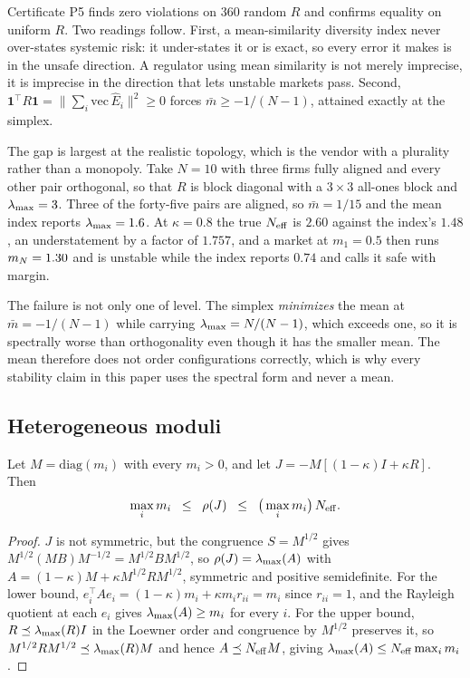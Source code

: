 Certificate P5 finds zero violations on 360 random $R$ and confirms equality on uniform $R$. Two readings follow. First, a mean-similarity diversity index never over-states systemic risk: it under-states it or is exact, so every error it makes is in the unsafe direction. A regulator using mean similarity is not merely imprecise, it is imprecise in the direction that lets unstable markets pass. Second, $\mathbf{1}^{\top}R\mathbf{1} = \|\sum_i \mathrm{vec}\,\hat{E}_i\|^2 \geq 0$ forces $\bar{m} \geq -1/(N-1)$, attained exactly at the simplex.

The gap is largest at the realistic topology, which is the vendor with a plurality rather than a monopoly. Take $N=10$ with three firms fully aligned and every other pair orthogonal, so that $R$ is block diagonal with a $3\times 3$ all-ones block and $\lambda_{\max} = 3$. Three of the forty-five pairs are aligned, so $\bar{m} = 1/15$ and the mean index reports $\lambda_{\max} = 1.6$. At $\kappa = 0.8$ the true $N_{\mathrm{eff}}$ is $2.60$ against the index's $1.48$, an understatement by a factor of $1.757$, and a market at $m_1 = 0.5$ then runs $m_N = 1.30$ and is unstable while the index reports $0.74$ and calls it safe with margin.

The failure is not only one of level. The simplex \emph{minimizes} the mean at $\bar{m} = -1/(N-1)$ while carrying $\lambda_{\max} = N/(N-1)$, which exceeds one, so it is spectrally worse than orthogonality even though it has the smaller mean. The mean therefore does not order configurations correctly, which is why every stability claim in this paper uses the spectral form and never a mean.

\subsection{Heterogeneous moduli}

\begin{aproposition}
\label{prop:hetmod}
Let $M=\mathrm{diag}(m_i)$ with every $m_i>0$, and let $J = -M[(1-\kappa)I+\kappa R]$. Then
\[
  \max_i m_i \;\;\leq\;\; \rho(J) \;\;\leq\;\; \big(\max_i m_i\big)\,N_{\mathrm{eff}} .
\]
\end{aproposition}

\begin{proof}
$J$ is not symmetric, but the congruence $S = M^{1/2}$ gives $M^{1/2}(MB)M^{-1/2} = M^{1/2}BM^{1/2}$, so $\rho(J) = \lambda_{\max}(A)$ with $A = (1-\kappa)M + \kappa M^{1/2}RM^{1/2}$, symmetric and positive semidefinite. For the lower bound, $e_i^{\top}Ae_i = (1-\kappa)m_i + \kappa m_i r_{ii} = m_i$ since $r_{ii}=1$, and the Rayleigh quotient at each $e_i$ gives $\lambda_{\max}(A) \geq m_i$ for every $i$. For the upper bound, $R \preceq \lambda_{\max}(R) I$ in the Loewner order and congruence by $M^{1/2}$ preserves it, so $M^{1/2}RM^{1/2} \preceq \lambda_{\max}(R)M$ and hence $A \preceq N_{\mathrm{eff}} M$, giving $\lambda_{\max}(A) \leq N_{\mathrm{eff}} \max_i m_i$.
\end{proof}

